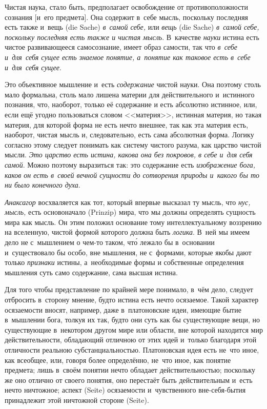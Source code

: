 Чистая наука, стало быть, предполагает освобождение от противоположности
сознания [и~его предмета]. Она содержит в~себе мысль, поскольку последняя
есть также и~вещь (die Sache) {\em в~самой себе,} или
{\em вещь} (die Sache) {\em в~самой себе, поскольку последняя есть также
и чистая мысль}. В~качестве {\em науки} истина есть чистое развивающееся
самосознание, имеет образ самости, так что {\em в~себе и~для~себя сущее
есть знаемое понятие, а~понятие как таковое есть в~себе и~для~себя сущее}.

Это объективное мышление и~есть {\em содержание} чистой
науки. Она поэтому столь мало формальна, столь мало лишена материи для
действительного и~истинного познания, что, наоборот, только её содержание и
есть абсолютно истинное, или, если ещё угодно пользоваться словом
<<материя>>, истинная материя, но такая материя, для которой форма не есть
нечто внешнее, так как эта материя есть, наоборот, чистая мысль и,
следовательно, есть сама абсолютная форма. Логику согласно этому следует
понимать как систему чистого разума, как царство чистой мысли.
{\em Это царство есть истина, какова она без покровов,
в себе и~для себя самой}. Можно поэтому выразиться так: это содержание есть
{\em изображение бога, каков он есть в~своей вечной
сущности до сотворения природы и~какого бы то ни было конечного духа}.

{\em Анаксагор} восхваляется как тот, который впервые
высказал ту мысль, что {\em нус,}
{\em мысль,} есть основоначало (Prinzip) мира, что мы
должны определять сущность мира как мысль. Он этим положил основание тому
интеллектуальному воззрению на вселенную, чистой формой которого должна
быть {\em логика}. В~ней мы имеем дело не с~мышлением о
чем-то таком, чт\'{о} лежало бы в~основании и~существовало бы особо, вне
мышления, не с~формами, которые якобы дают только
{\em признаки} истины, а~необходимые формы и
собственные определения мышления суть само содержание, сама высшая истина.

Для того чтобы представление по крайней мере понимало, в~чём дело, следует
отбросить в~сторону мнение, будто истина есть нечто осязаемое. Такой
характер осязаемости вносят, например, даже в~платоновские идеи, имеющие
бытие в~мышлении бога, толкуя их так, будто они суть как бы существующие
вещи, но существующие в~некотором другом мире или области, вне которой
находится мир действительности, обладающий отличною от этих идей и~только
благодаря этой отличности реальною субстанциальностью. Платоновская идея
есть не~что иное, как всеобщее, или, говоря более определённо, не~что иное,
как понятие предмета; лишь в~своём понятии нечто обладает
действительностью; поскольку же оно отлично от своего понятия, оно
перестаёт быть действительным и~есть нечто ничтожное; аспект (Seite)
осязаемости и~чувственного вне-себя-бытия принадлежит этой ничтожной
стороне (Seite).

